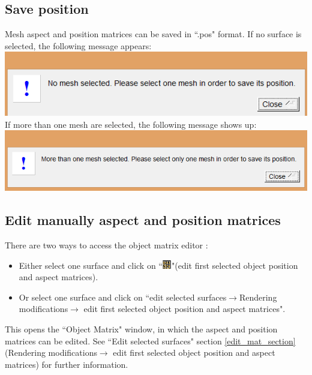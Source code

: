 \subsection{Save position}
Mesh aspect and position matrices can be saved in ``.pos" format. If no surface is selected, the
following message appears:\\
\includegraphics[scale=0.5]{images/File/save_pos1.png}
\\
If more than one mesh are selected, the following message shows up:\\
\includegraphics[scale=0.5]{images/File/save_pos2png.png}

\subsection{Edit manually aspect and position matrices}
There are two ways to access the object matrix editor :
\begin{itemize}

\item Either select one surface and click on ``\includegraphics[scale=0.7]{images/pixmap/mat.png}"(edit first selected object position and aspect matrices).
\item Or select one surface and click on ``edit selected surfaces$\rightarrow$Rendering modifications$\rightarrow$ edit first
selected object position and aspect matrices".
\end{itemize}



This opens the ``Object Matrix" window, in which the aspect and position matrices can be edited. See ``Edit selected surfaces" section \ref{edit_mat_section} (Rendering modifications$\rightarrow$ edit first selected object position and aspect matrices) for further information.




